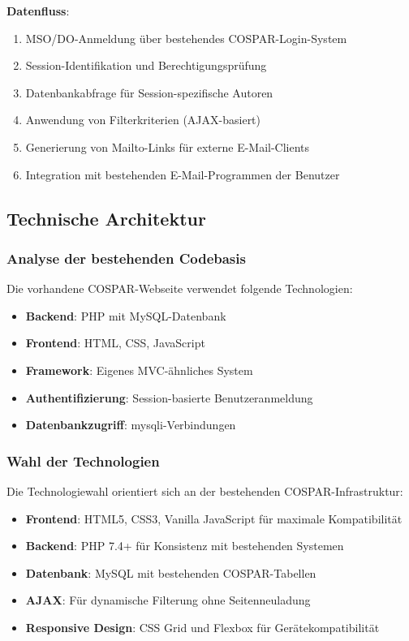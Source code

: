 \documentclass[11pt,a4paper]{article}
\begin{document}
\textbf{Datenfluss}:
\begin{enumerate}
    \item MSO/DO-Anmeldung über bestehendes COSPAR-Login-System
    \item Session-Identifikation und Berechtigungsprüfung
    \item Datenbankabfrage für Session-spezifische Autoren
    \item Anwendung von Filterkriterien (AJAX-basiert)
    \item Generierung von Mailto-Links für externe E-Mail-Clients
    \item Integration mit bestehenden E-Mail-Programmen der Benutzer
\end{enumerate}

\subsection{Technische Architektur}

\subsubsection{Analyse der bestehenden Codebasis}
Die vorhandene COSPAR-Webseite verwendet folgende Technologien:
\begin{itemize}
    \item \textbf{Backend}: PHP mit MySQL-Datenbank
    \item \textbf{Frontend}: HTML, CSS, JavaScript
    \item \textbf{Framework}: Eigenes MVC-ähnliches System
    \item \textbf{Authentifizierung}: Session-basierte Benutzeranmeldung
    \item \textbf{Datenbankzugriff}: mysqli-Verbindungen
\end{itemize}

\subsubsection{Wahl der Technologien}
Die Technologiewahl orientiert sich an der bestehenden COSPAR-Infrastruktur:
\begin{itemize}
    \item \textbf{Frontend}: HTML5, CSS3, Vanilla JavaScript für maximale Kompatibilität
    \item \textbf{Backend}: PHP 7.4+ für Konsistenz mit bestehenden Systemen
    \item \textbf{Datenbank}: MySQL mit bestehenden COSPAR-Tabellen
    \item \textbf{AJAX}: Für dynamische Filterung ohne Seitenneuladung
    \item \textbf{Responsive Design}: CSS Grid und Flexbox für Gerätekompatibilität
\end{itemize}
\end{document}
